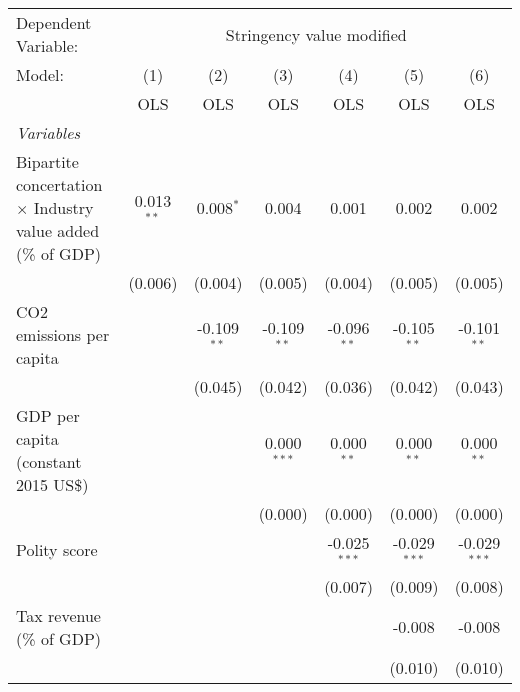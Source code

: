 
\begingroup
\centering
\begin{tabular}{lcccccc}
   \toprule
   Dependent Variable: & \multicolumn{6}{c}{Stringency value modified}\\
   Model:                                                             & (1)          & (2)           & (3)           & (4)            & (5)            & (6)\\  
                                                                      &  OLS         & OLS           & OLS           & OLS            & OLS            & OLS\\  
   \midrule
   \emph{Variables}\\
   Bipartite concertation $\times$ Industry value added (\% of GDP)   & 0.013$^{**}$ & 0.008$^{*}$   & 0.004         & 0.001          & 0.002          & 0.002\\   
                                                                      & (0.006)      & (0.004)       & (0.005)       & (0.004)        & (0.005)        & (0.005)\\   
   CO2 emissions per capita                                           &              & -0.109$^{**}$ & -0.109$^{**}$ & -0.096$^{**}$  & -0.105$^{**}$  & -0.101$^{**}$\\   
                                                                      &              & (0.045)       & (0.042)       & (0.036)        & (0.042)        & (0.043)\\   
   GDP per capita (constant 2015 US\$)                                &              &               & 0.000$^{***}$ & 0.000$^{**}$   & 0.000$^{**}$   & 0.000$^{**}$\\   
                                                                      &              &               & (0.000)       & (0.000)        & (0.000)        & (0.000)\\   
   Polity score                                                       &              &               &               & -0.025$^{***}$ & -0.029$^{***}$ & -0.029$^{***}$\\   
                                                                      &              &               &               & (0.007)        & (0.009)        & (0.008)\\   
   Tax revenue (\% of GDP)                                            &              &               &               &                & -0.008         & -0.008\\   
                                                                      &              &               &               &                & (0.010)        & (0.010)\\   

\end{tabular}
